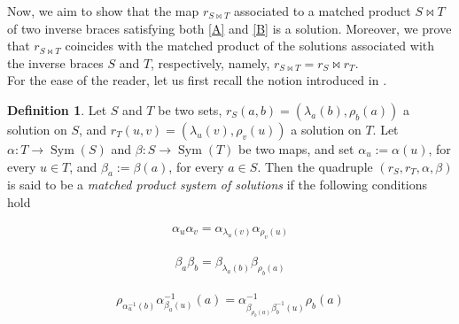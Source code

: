 \documentclass[preprint,1p]{elsarticle}
\theoremstyle{definition}               %
\newtheorem{defin}[theor]{Definition}
\DeclareMathOperator{\Sym}{Sym}
\begin{document}


Now, we aim to show that the map $r_{S\bowtie T}$ associated to a matched product $S \bowtie T$ of two inverse braces satisfying both \eqref{A} and \eqref{B} is a solution. Moreover, we prove that  $r_{S\bowtie T}$ coincides with the matched product of the solutions associated with the inverse braces $S$ and $T$, respectively, namely, $r_{S\bowtie T}=r_S \bowtie r_T$.\\
For the ease of the reader, let us first recall the notion introduced in \cite{CCoSt20}. 

\begin{defin} Let $S$ and $T$ be two sets, $r_S(a, b)=(\lambda_a(b), \rho_b(a))$ a solution on $S$, and $r_T(u, v)=(\lambda_u(v), \rho_v(u))$ a solution on $T$. Let $\alpha: T \to \Sym\left(S\right)$ and $\beta: S \to \Sym\left(T\right)$ be two maps, and set $\alpha_u:=\alpha\left(u\right)$, for every $u \in T$, and $\beta_a:=\beta\left(a\right)$, for every $a\in S$. Then the quadruple $\left(r_S,r_T, \alpha,\beta\right)$ is said to be a \emph{matched product system of solutions} if the following conditions hold
	{
		\begin{center}
			\begin{minipage}[b]{.5\textwidth}
				\vspace{-\baselineskip}
				\begin{align}\label{eq:primo}\tag{s1}
					\alpha_u\alpha_v = \alpha_{\lambda_u\left(v\right)}\alpha_{\rho_{v}\left(u\right)}
				\end{align}
			\end{minipage}%
			\hfill\hfill\hfill
			\begin{minipage}[b]{.5\textwidth}
				\vspace{-\baselineskip}			\begin{align}\label{eq:secondo}\tag{s2}			\beta_a\beta_b=\beta_{\lambda_a\left(b\right)}\beta_{\rho_b\left(a\right)}
				\end{align}
			\end{minipage}
		\end{center}
		\begin{center}
			\begin{minipage}[b]{.5\textwidth}
				\vspace{-\baselineskip}
				\begin{align}\label{eq:quinto}\tag{s3}
					\rho_{\alpha^{-1}_u\!\left(b\right)}\alpha^{-1}_{\beta_a\left(u\right)}\left(a\right) = \alpha^{-1}_{\beta_{\rho_b\left(a\right)}\beta^{-1}_b\left(u\right)}\rho_b\left(a\right)

\end{align}
\end{minipage}
\end{center}}
\end{defin}
\end{document}
